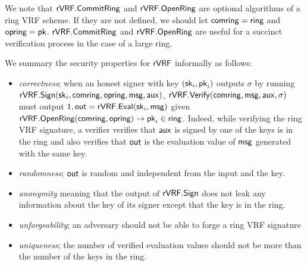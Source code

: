 We note that $ {\mathsf{rVRF}}.{\mathsf{CommitRing}} $ and $  {\mathsf{rVRF}}.{\mathsf{OpenRing}} $ are optional algorithms of a ring VRF scheme. If they are not defined, we should let $ \mathsf{comring} = \mathsf{ring} $ and $ \mathsf{opring}  = \mathsf{pk}$. $ {\mathsf{rVRF}}.{\mathsf{CommitRing}} $ and $  {\mathsf{rVRF}}.{\mathsf{OpenRing}} $ are useful for a succinct verification process in the case of a large ring.

We summary the  security properties for $ {\mathsf{rVRF}} $  informally as follows: 
\begin{itemize}
	\item \emph{correctness}; when an honest signer with key $ (\mathsf{sk}_i,\mathsf{pk}_i) $ outputs $ \sigma $ by running $ {\mathsf{rVRF}}.{\mathsf{Sign}}(\mathsf{sk}_i, \mathsf{comring},\mathsf{opring}, \mathsf{msg}, \mathsf{aux}) $, $ {\mathsf{rVRF}}.{\mathsf{Verify}}(\mathsf{comring},\mathsf{msg},\mathsf{aux},\sigma)  $ must output $ 1,{\mathsf{out}} = {\mathsf{rVRF}}.{\mathsf{Eval}}(\mathsf{sk}_i, \mathsf{msg}) $ given  $ {\mathsf{rVRF}}.{\mathsf{OpenRing}}(\mathsf{comring},\mathsf{opring}) \rightarrow \mathsf{pk}_i \in \mathsf{ring}$. Indeed, while verifying the ring VRF signature, a verifier verifies that $ \mathsf{aux} $ is signed by one of the keys is in the ring and also verifies that  $ {\mathsf{out}} $ is the evaluation value of $ \mathsf{msg} $ generated with the same key. 
	\item \emph{randomness}; $ {\mathsf{out}} $ is random and independent from the input and the  key.
	\item   \emph{anonymity} meaning that the output of $ {\mathsf{rVRF}}.{\mathsf{Sign}} $ does not leak any information about the key of its signer except that the key is in the ring.
	\item \emph{unforgeability}; an adversary should not be able to forge a ring VRF signature 
	\item  \emph{uniqueness}; the number of verified evaluation values should not be more than the number of the keys in the ring.
\end{itemize}






